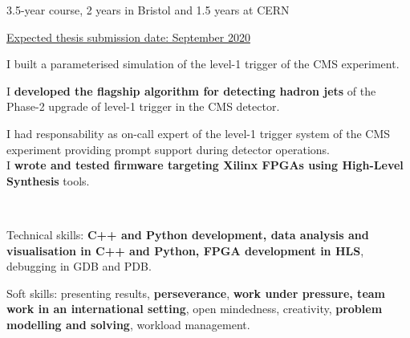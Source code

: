 \documentclass[10pt,a4paper]{altacv}
\begin{document}

%

\begin{fullwidth}
\makecvheader
\end{fullwidth}

%





\begin{itemize}
    \setlength{\itemindent}{0.5em}
    \item[--]   \small{3.5-year course, 2 years in Bristol and 1.5 years at CERN}
    \item[--]   \small{\underline{Expected thesis submission date: September 2020}}
    \item[--]   \small{I built a parameterised simulation of the level-1 trigger of the CMS experiment. }\\[0.1cm]
    \item[--]   \small{I \textbf{developed the flagship algorithm for detecting hadron jets} of the Phase-2 upgrade of level-1 trigger in the CMS detector. 
    \item[--]   \small{I had responsability as on-call expert of the level-1 trigger system of the CMS experiment providing prompt support during detector operations.}\\[0.1cm]
    I \textbf{wrote and tested firmware targeting Xilinx FPGAs using High-Level Synthesis} tools.}\\[0.1cm]
    \item[--] \small{Technical skills: \textbf{C++ and Python development, data analysis and visualisation in C++ and Python, FPGA development in HLS}, debugging in GDB and PDB.}
    \item[--] \small{Soft skills: presenting results, \textbf{perseverance}, \textbf{work under pressure, team work in an international setting}, open mindedness, creativity, \textbf{problem modelling and solving}, workload management.}  
\end{itemize}
\end{document}
